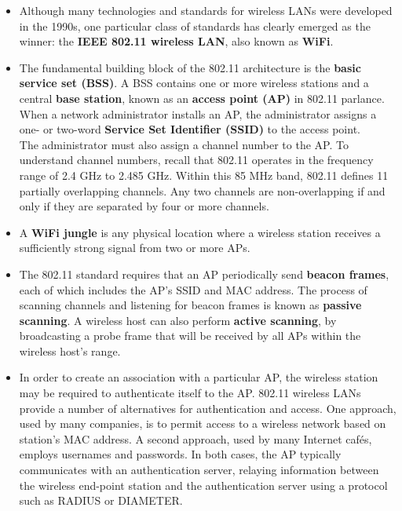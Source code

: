 \begin{itemize}
\item
Although many technologies and standards for wireless LANs were developed in the 1990s, one particular class of standards has clearly emerged as the winner: the \textbf{IEEE 802.11 wireless LAN}, also known as \textbf{WiFi}.

\item
The fundamental building block of the 802.11 architecture is the \textbf{basic service set (BSS)}. A BSS contains one or more wireless stations and a central \textbf{base station}, known as an \textbf{access point (AP)} in 802.11 parlance.\\
When a network administrator installs an AP, the administrator assigns a one- or two-word \textbf{Service Set Identifier (SSID)} to the access point.\\
The administrator must also assign a channel number to the AP. To understand channel numbers, recall that 802.11 operates in the frequency range of 2.4 GHz to 2.485 GHz. Within this 85 MHz band, 802.11 defines 11 partially overlapping channels. Any two channels are non-overlapping if and only if they are separated by four or more channels.

\item
A \textbf{WiFi jungle} is any physical location where a wireless station receives a sufficiently strong signal from two or more APs.

\item
The 802.11 standard requires that an AP periodically send \textbf{beacon frames}, each of which includes the AP's SSID and MAC address. The process of scanning channels and listening for beacon frames is known as \textbf{passive scanning}. A wireless host can also perform \textbf{active scanning}, by broadcasting a probe frame that will be received by all APs within the wireless host's range.

\item
In order to create an association with a particular AP, the wireless station may be required to authenticate itself to the AP. 802.11 wireless LANs provide a number of alternatives for authentication and access. One approach, used by many companies, is to permit access to a wireless network based on station's MAC address. A second approach, used by many Internet caf\'{e}s, employs usernames and passwords. In both cases, the AP typically communicates with an authentication server, relaying information between the wireless end-point station and the authentication server using a protocol such as RADIUS or DIAMETER.


\end{itemize}

